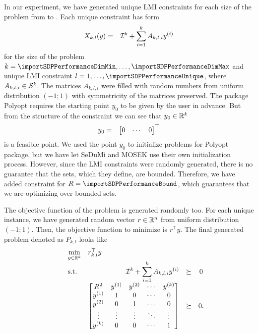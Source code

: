 In our experiment, we have generated \importSDPPerformanceUnique{} unique LMI constraints for each size of the problem from \importSDPPerformanceDimMin{} to \importSDPPerformanceDimMax{}.
Each unique constraint has form
\begin{eqnarray}
  X_{k,l}(y) &=& \Iden k + \sum_{i=1}^k A_{k,l,i} y\ind i\labeleq{SDP:perf:constr}
\end{eqnarray}
for the size of the problem $k = \importSDPPerformanceDimMin, \ldots, \importSDPPerformanceDimMax$ and unique LMI constraint $l = 1,\ldots, \importSDPPerformanceUnique$, where $A_{k,l,i}\in\mathcal{S}^k$.
The matrices $A_{k,l,i}$ were filled with random numbers from uniform distribution $(-1;1)$ with symmetricity of the matrices preserved.
The package Polyopt requires the starting point $y_0$ to be given by the user in advance.
But from the structure of the constraint  we can see that $y_0\in\mathbb{R}^k$
\begin{eqnarray}
  y_0 &=& \begin{bmatrix} 0 & \cdots & 0\end{bmatrix}^\top
\end{eqnarray}
is a feasible point.
We used the point $y_0$ to initialize problems for Polyopt package, but we have let SeDuMi and MOSEK use their own initialization process. 
However, since the LMI constraints were randomly generated, there is no guarantee that the sets, which they define, are bounded.
Therefore, we have added constraint  for $R = \importSDPPerformanceBound$, which guarantees that we are optimizing over bounded sets.

The objective function of the problem is generated randomly too.
For each unique instance, we have generated random vector $r\in\mathbb{R}^n$ from uniform distribution $(-1;1)$.
Then, the objective function to minimize is $r^\top y$.
The final generated problem denoted as $P_{k,l}$ looks like
\begin{eqnarray}
  \begin{array}{rclrrclcll}
    && \displaystyle \min_{y\in\R^k} & \multicolumn{3}{l}{r_{k,l}^\top y} \\
    && \text{s.t.} & \displaystyle \Iden k + \sum_{i=1}^k A_{k,l,i} y\ind i &\succeq& 0 \\
    &&& \bmB R^2 & y\ind1 & y\ind2 & \cdots & y\ind k\\
          y\ind1 & 1 & 0 & \cdots & 0\\
          y\ind2 & 0 & 1 & \cdots & 0\\
          \vdots & \vdots & \vdots & \ddots & \vdots\\
          y\ind k & 0 & 0 & \cdots & 1\bmE &\succeq& 0.
 \end{array}
\end{eqnarray}

